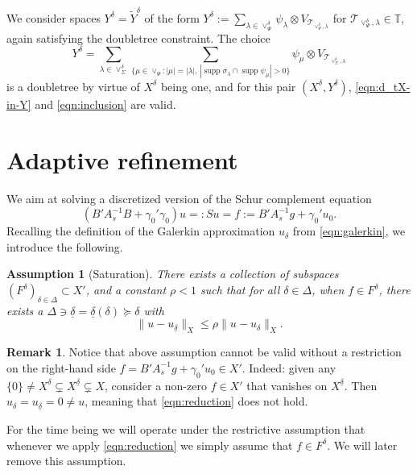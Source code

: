 \documentclass[11pt,a4paper,oneside,english]{amsart}
\numberwithin{equation}{section}
\numberwithin{theorem}{section}
\newtheorem{assum}[theorem]{Assumption}
\theoremstyle{definition}
\newtheorem{remark}[theorem]{Remark}
\DeclareMathOperator{\supp}{supp}
\newcommand{\T}{\mathcal{T}}
\newcommand{\udelta}{{\underline{\delta}}}
\begin{document}
We consider spaces $Y^\delta = \tilde Y^\delta$ of the form
$Y^\delta := \sum_{\lambda \in \vee^\delta_\Psi} \psi_\lambda \otimes V_{\T_{\vee^\delta_\Psi, \lambda}}$
for $\T_{\vee^\delta_\Psi, \lambda} \in \mathbb T$, again satisfying the doubletree
constraint. The choice
\[
  Y^\delta = \sum_{\lambda \in \vee_\Sigma^\delta} \sum_{\{\mu \in \vee_\Psi\colon |\mu|=|\lambda|,\,
|\supp \sigma_\lambda \cap \supp \psi_\mu|>0\}} \psi_\mu \otimes V_{\T_{\vee_\Sigma^\delta,\lambda}}
\]
is a doubletree by virtue of $X^\delta$ being one, and for this pair $(X^\delta, Y^\delta)$, \eqref{eqn:d_tX-in-Y} and \eqref{eqn:inclusion} are valid.

\section{Adaptive refinement}
We aim at solving a discretized version of the Schur complement equation
\begin{equation}
  \label{eqn:schur}
 (B' A_s^{-1} B + \gamma_0' \gamma_0)u =: Su = f := B' A_s^{-1}g+\gamma_0' u_0.
\end{equation}
Recalling the definition of the Galerkin approximation $u_\delta$ from \eqref{eqn:galerkin},
we introduce the following.


\begin{assum}[Saturation] \label{assum:saturation}
There exists a collection of subspaces $(F^\delta)_{\delta \in \Delta} \subset X'$, and
a constant $\rho<1$ such that for all $\delta \in \Delta$, when $f \in F^\delta$,
there exists a $\Delta \ni \udelta=\udelta(\delta) \succeq \delta$ with
\begin{equation}
  \label{eqn:reduction}
  \|u-u_\udelta\|_X \leq \rho \|u-u_\delta\|_X.
\end{equation}
\end{assum}
\begin{remark} \label{data-oscillation}
  Notice that above assumption cannot be valid without a restriction on the
  right-hand side $f =B' A_s^{-1}g+\gamma_0' u_0\in X'$. Indeed: given any
  $\{0\} \neq X^\delta \subsetneq X^{\udelta} \subsetneq X$, consider a non-zero
  $f \in X'$ that vanishes on $X^{\udelta}$. Then $u_\delta=u_\udelta=0 \neq u$,
  meaning that \eqref{eqn:reduction} does not hold. 
\end{remark}

For the time being we will operate under the restrictive assumption that whenever
we apply \eqref{eqn:reduction} we simply assume that $f \in F^\delta$. We will
later remove this assumption.
\end{document}
